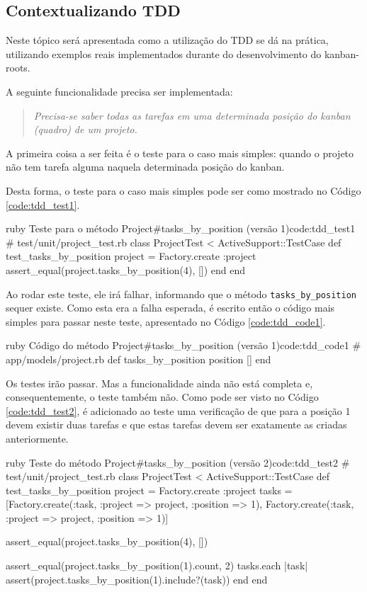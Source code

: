 \subsection{Contextualizando TDD}
\label{ssub:contextualizando_tdd}

Neste tópico será apresentada como a utilização do TDD se dá na prática, utilizando exemplos reais implementados durante do desenvolvimento do kanban-roots.

A seguinte funcionalidade precisa ser implementada:

\begin{quote}
\textit{Precisa-se saber todas as tarefas em uma determinada posição do kanban (quadro) de um projeto.}
\end{quote}

A primeira coisa a ser feita é o teste para o caso mais simples: quando o projeto não tem tarefa alguma naquela determinada posição do kanban.

Desta forma, o teste para o caso mais simples pode ser como mostrado no Código \ref{code:tdd_test1}.

\begin{mycode}{ruby}%
{Teste para o método Project\#tasks\_by\_position (versão 1)}{code:tdd_test1}
# test/unit/project_test.rb
class ProjectTest < ActiveSupport::TestCase
  def test_tasks_by_position
    project = Factory.create :project
    assert_equal(project.tasks_by_position(4), [])
  end
end
\end{mycode}

Ao rodar este teste, ele irá falhar, informando que o método \texttt{tasks\_by\_position} sequer existe. Como esta era a falha esperada, é escrito então o código mais simples para passar neste teste, apresentado no Código \ref{code:tdd_code1}.

\begin{mycode}{ruby}%
{Código do método Project\#tasks\_by\_position (versão 1)}{code:tdd_code1}
# app/models/project.rb
def tasks_by_position position
  []
end
\end{mycode}

Os testes irão passar. Mas a funcionalidade ainda não está completa e, consequentemente, o teste também não. Como pode ser visto no Código \ref{code:tdd_test2}, é adicionado ao teste uma verificação de que para a posição 1 devem existir duas tarefas e que estas tarefas devem ser exatamente as criadas anteriormente.

\begin{mycode}{ruby}%
{Teste do método Project\#tasks\_by\_position (versão 2)}{code:tdd_test2}
# test/unit/project_test.rb
class ProjectTest < ActiveSupport::TestCase
  def test_tasks_by_position
    project = Factory.create :project
    tasks = [Factory.create(:task, :project => project, :position => 1),
             Factory.create(:task, :project => project, :position => 1)]

    assert_equal(project.tasks_by_position(4), [])

    assert_equal(project.tasks_by_position(1).count, 2)
    tasks.each { |task| assert(project.tasks_by_position(1).include?(task)) }
  end
end
\end{mycode}

